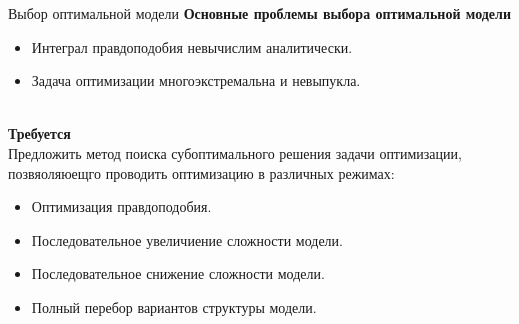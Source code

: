 \documentclass[usenames,dvipsnames,11pt,pdf,utf8,russian,aspectratio=169]{beamer}
\begin{document}
\begin{frame}{Выбор оптимальной модели}
\textbf{Основные проблемы выбора оптимальной модели}\\
\begin{itemize}
\item Интеграл правдоподобия невычислим аналитически.
\item Задача оптимизации многоэкстремальна и невыпукла.
\end{itemize}
~\\
\textbf{Требуется}\\ 
Предложить метод поиска субоптимального решения задачи оптимизации, позвяоляюещго проводить оптимизацию в различных режимах:
\begin{itemize}
\item Оптимизация правдоподобия.
\item Последовательное увеличиение сложности модели.
\item Последовательное снижение сложности модели.
\item Полный перебор вариантов структуры модели.
\end{itemize}

\end{frame}       


                                                                                                                                   
                                                                                                                                    
\end{document}
